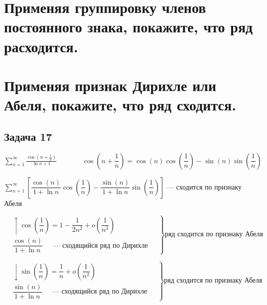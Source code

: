 \documentclass[a4paper,fleqn]{article}
\begin{document}
	
	
	\section*{Применяя группировку членов постоянного знака, покажите, что ряд расходится.}
	
	
	
	
	
	\section*{Применяя признак Дирихле или Абеля, покажите, что ряд сходится.}
	
	
	
	
	
	\subsection*{Задача 17}
	$\sum_{n=1}^{\infty} \frac{\cos \left(n+\frac{1}{n}\right)}{\ln n+1} \;\;\;\;\;\;\;\;\;\;\;\;\; \cos\left(n + \dfrac{1}{n}\right) = \cos(n)\cos\left(\dfrac{1}{n}\right) - \sin(n)\sin\left(\dfrac{1}{n}\right)$
	
	$ \sum_{n=1}^{\infty} \left[\dfrac{\cos(n)}{1+\ln n} \cos\left(\dfrac{1}{n}\right) - \dfrac{\sin(n) }{1+\ln n}\sin\left(\dfrac{1}{n}\right)\right]$ --- сходится по признаку Абеля
	
	
$	
\left.
	\begin{matrix}
		&\uparrow \cos\left(\dfrac{1}{n}\right)  = 1 - \dfrac{1}{2n^2} + o\left(\dfrac{1}{n^3}\right) &\\
		&\dfrac{\cos(n)}{1+\ln n}  \;\;\;\; \text{ --- сходящийся ряд по Дирихле   }&
	\end{matrix} \right\} \text{ряд сходится по признаку Абеля}
$	

$	
\left.
\begin{matrix}
&\downarrow \sin\left(\dfrac{1}{n}\right) = \dfrac{1}{n} + o\left(\dfrac{1}{n^2}\right) &\\
&\dfrac{\sin(n) }{1+\ln n} \;\;\;\; \text{ --- сходящийся ряд по Дирихле   }&
\end{matrix} \right\} \text{ряд сходится по признаку Абеля}
$	
\end{document}
